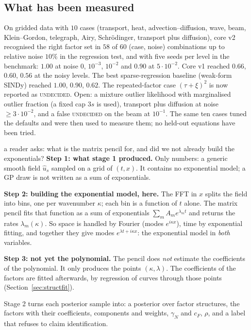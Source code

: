 \documentclass[11pt,a4paper]{article}
\theoremstyle{definition}
\begin{document}
\subsection{What has been measured}
On gridded data with $10$ cases (transport, heat, advection--diffusion, wave, beam, Klein--Gordon, telegraph, Airy, Schr\"odinger, transport plus diffusion), core v2 recognised the right factor set in $58$ of $60$ (case, noise) combinations up to relative noise $10\%$ in the regression test, and with five seeds per level in the benchmark: $1.00$ at noise $0$, $10^{-3}$, $10^{-2}$ and $0.90$ at $5\cdot10^{-2}$. Core v1 reached $0.66$, $0.60$, $0.56$ at the noisy levels. The best sparse-regression baseline (weak-form SINDy) reached $1.00$, $0.90$, $0.62$. The repeated-factor case $(\tau+\xi)^2$ is now reported as \textsc{undecided}. Open: a mixture outlier likelihood with marginalised outlier fraction (a fixed cap $3s$ is used), transport plus diffusion at noise $\ge3\cdot10^{-2}$, and a false \textsc{undecided} on the beam at $10^{-1}$. The same ten cases tuned the defaults and were then used to measure them; no held-out equations have been tried.

\begin{explained}{a reader asks: what is the matrix pencil for, and did we not already build the exponentials?}
\textbf{Step 1: what stage 1 produced.} Only numbers: a generic smooth field $\hat u_s$ sampled on a grid of $(t,x)$. It contains no exponential model; a GP draw is not written as a sum of exponentials.

\medskip\textbf{Step 2: building the exponential model, here.} The FFT in $x$ splits the field into bins, one per wavenumber $\kappa$; each bin is a function of $t$ alone. The matrix pencil fits that function as a sum of exponentials $\sum_mA_me^{\lambda_mt}$ and returns the rates $\lambda_m(\kappa)$. So space is handled by Fourier (modes $e^{i\kappa x}$), time by exponential fitting, and together they give modes $e^{\lambda t+i\kappa x}$: the exponential model in \emph{both} variables.

\medskip\textbf{Step 3: not yet the polynomial.} The pencil does \emph{not} estimate the coefficients of the polynomial. It only produces the points $(\kappa,\lambda)$. The coefficients of the factors are fitted afterwards, by regression of curves through those points (Section~\ref{sec:structfit}).
\end{explained}

\begin{takeaway}
Stage 2 turns each posterior sample into: a posterior over factor structures, the factors with their coefficients, components and weights, $\gamma_N$ and $c_F$, $\rho$, and a label that refuses to claim identification.
\end{takeaway}
\end{document}
